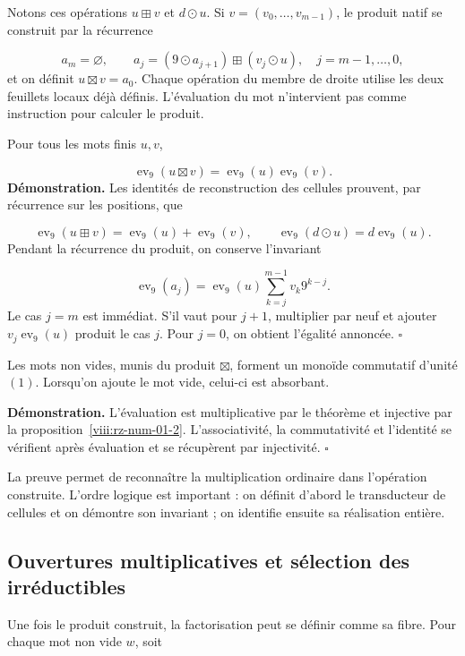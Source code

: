 Notons ces opérations $u\boxplus v$ et $d\odot u$. Si $v=(v_0,\ldots,v_{m-1})$, le produit natif se construit par la récurrence

\[
a_m=\varnothing,\qquad
a_j=(9\odot a_{j+1})\boxplus(v_j\odot u),
\quad j=m-1,\ldots,0,
\]
et on définit $u\boxtimes v=a_0$. Chaque opération du membre de droite utilise les deux feuillets locaux déjà définis. L'évaluation du mot n'intervient pas comme instruction pour calculer le produit.

Pour tous les mots finis $u,v$,

\[
\operatorname{ev}_9(u\boxtimes v)
=\operatorname{ev}_9(u)\operatorname{ev}_9(v).
\]
\textbf{Démonstration.} Les identités de reconstruction des cellules prouvent, par récurrence sur les positions, que

\[
\operatorname{ev}_9(u\boxplus v)
=\operatorname{ev}_9(u)+\operatorname{ev}_9(v),\qquad
\operatorname{ev}_9(d\odot u)=d\operatorname{ev}_9(u).
\]
Pendant la récurrence du produit, on conserve l'invariant

\[
\operatorname{ev}_9(a_j)
=\operatorname{ev}_9(u)\sum_{k=j}^{m-1}v_k9^{k-j}.
\]
Le cas $j=m$ est immédiat. S'il vaut pour $j+1$, multiplier par neuf et ajouter $v_j\operatorname{ev}_9(u)$ produit le cas $j$. Pour $j=0$, on obtient l'égalité annoncée. \hfill\(\square\)

Les mots non vides, munis du produit $\boxtimes$, forment un monoïde commutatif d'unité $(1)$. Lorsqu'on ajoute le mot vide, celui-ci est absorbant.

\textbf{Démonstration.} L’évaluation est multiplicative par le théorème et injective par la proposition~\ref{viii:rz-num-01-2}. L’associativité, la commutativité et l’identité se vérifient après évaluation et se récupèrent par injectivité. \hfill\(\square\)

La preuve permet de reconnaître la multiplication ordinaire dans l'opération construite. L'ordre logique est important : on définit d'abord le transducteur de cellules et on démontre son invariant ; on identifie ensuite sa réalisation entière.

\subsection{Ouvertures multiplicatives et sélection des irréductibles}
Une fois le produit construit, la factorisation peut se définir comme sa fibre. Pour chaque mot non vide $w$, soit

